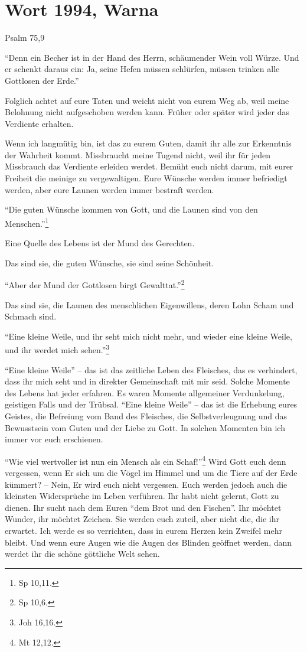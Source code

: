 \chapter{Wort 1994, Warna}

Psalm 75,9

"`Denn ein Becher ist in der Hand des Herrn, schäumender Wein voll Würze. Und er schenkt daraus ein: Ja, seine Hefen müssen schlürfen, müssen trinken alle Gottlosen der Erde."'

Folglich achtet auf eure Taten und weicht nicht von eurem Weg ab, weil meine Belohnung nicht aufgeschoben werden kann. Früher oder später wird jeder das Verdiente erhalten. 

Wenn ich langmütig bin, ist das zu eurem Guten, damit ihr alle zur Erkenntnis der Wahrheit kommt. Missbraucht meine Tugend nicht, weil ihr für jeden Missbrauch das Verdiente erleiden werdet. Bemüht euch nicht darum, mit eurer Freiheit die meinige zu vergewaltigen. Eure Wünsche werden immer befriedigt werden, aber eure Launen werden immer bestraft werden. 

"`Die guten Wünsche kommen von Gott, und die Launen sind von den Menschen."'\footnote{Sp 10,11.}

Eine Quelle des Lebens ist der Mund des Gerechten.

Das sind sie, die guten Wünsche, sie sind seine Schönheit. 

"`Aber der Mund der Gottlosen birgt Gewalttat."'\footnote{Sp 10,6.}

Das sind sie, die Launen des menschlichen Eigenwillens, deren Lohn Scham und Schmach sind. 

"`Eine kleine Weile, und ihr seht mich nicht mehr, und wieder eine kleine Weile, und ihr werdet mich sehen."'\footnote{Joh 16,16.} 

"`Eine kleine Weile"' -- das ist das zeitliche Leben des Fleisches, das es verhindert, dass ihr mich seht und in direkter Gemeinschaft mit mir seid. Solche Momente des Lebens hat jeder erfahren. Es waren Momente allgemeiner Verdunkelung, geistigen Falls und der Trübsal. "`Eine kleine Weile"' -- das ist die Erhebung eures Geistes, die Befreiung vom Band des Fleisches, die Selbstverleugnung und das Bewusstsein vom Guten und der Liebe zu Gott. In solchen Momenten bin ich immer vor euch erschienen. 

"`Wie viel wertvoller ist nun ein Mensch als ein Schaf!"'\footnote{Mt 12,12.}
Wird Gott euch denn vergessen, wenn Er sich um die Vögel im Himmel und um die Tiere auf der Erde kümmert? -- Nein, Er wird euch nicht vergessen. Euch werden jedoch auch die kleinsten Widersprüche im Leben verführen. Ihr habt nicht gelernt, Gott zu dienen. Ihr sucht nach dem Euren "`dem Brot und den Fischen"'. Ihr möchtet Wunder, ihr möchtet Zeichen. Sie werden euch zuteil, aber nicht die, die ihr erwartet. Ich werde es so verrichten, dass in eurem Herzen kein Zweifel mehr bleibt. Und wenn eure Augen wie die Augen des Blinden geöffnet werden, dann werdet ihr die schöne göttliche Welt sehen. 


